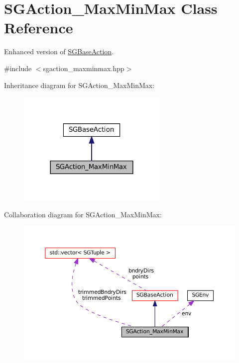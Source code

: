 \hypertarget{classSGAction__MaxMinMax}{}\section{S\+G\+Action\+\_\+\+Max\+Min\+Max Class Reference}
\label{classSGAction__MaxMinMax}


Enhanced version of \hyperlink{classSGBaseAction}{S\+G\+Base\+Action}.  




{\ttfamily \#include $<$sgaction\+\_\+maxminmax.\+hpp$>$}



Inheritance diagram for S\+G\+Action\+\_\+\+Max\+Min\+Max\+:
\nopagebreak
\begin{figure}[H]
\begin{center}
\leavevmode
\includegraphics[width=204pt]{classSGAction__MaxMinMax__inherit__graph}
\end{center}
\end{figure}


Collaboration diagram for S\+G\+Action\+\_\+\+Max\+Min\+Max\+:
\nopagebreak
\begin{figure}[H]
\begin{center}
\leavevmode
\includegraphics[width=350pt]{classSGAction__MaxMinMax__coll__graph}
\end{center}
\end{figure}
